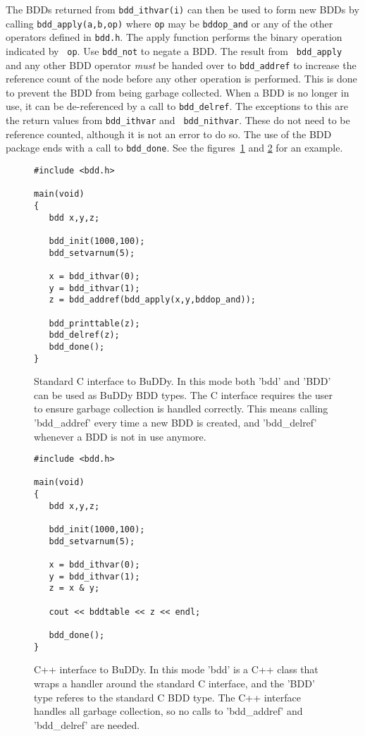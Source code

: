 \documentclass[a4paper,11pt,twoside,fleqn,openright]{report}
\newenvironment{Ill}
  {\\[\abovedisplayskip]\indent \begin{minipage}{\textwidth}}
  {\end{minipage} \\[\belowdisplayskip]}
\begin{document}
The BDDs returned from {\tt bdd\_ithvar(i)} can then be used to form
new BDDs by calling {\tt bdd\_apply(a,b,op)} where {\tt op} may be
{\tt bddop\_and} or any of the other operators defined in {\tt bdd.h}.
The apply function performs the binary operation indicated by {\tt
  op}.  Use {\tt bdd\_not} to negate a BDD.  The result from {\tt
  bdd\_apply} and any other BDD operator {\em must} be handed over to
{\tt bdd\_addref} to increase the reference count of the node before
any other operation is performed.  This is done to prevent the BDD
from being garbage collected. When a BDD is no longer in use, it can
be de-referenced by a call to {\tt bdd\_delref}.  The exceptions to
this are the return values from {\tt bdd\_ithvar} and {\tt
  bdd\_nithvar}. These do not need to be reference counted, although
it is not an error to do so. The use of the BDD package ends with a
call to {\tt bdd\_done}. See the figures~\ref{fig:cinterface} and
\ref{fig:cppinterface} for an example.

\begin{figure}[tb]
\begin{verbatim}
#include <bdd.h>

main(void)
{
   bdd x,y,z;

   bdd_init(1000,100);
   bdd_setvarnum(5);

   x = bdd_ithvar(0);
   y = bdd_ithvar(1);
   z = bdd_addref(bdd_apply(x,y,bddop_and));

   bdd_printtable(z);
   bdd_delref(z);
   bdd_done();
}
\end{verbatim}
  \caption{Standard C interface to BuDDy. In this mode both 'bdd' and
    'BDD' can be used as BuDDy BDD types. The C interface requires the
    user to ensure garbage collection is handled correctly. This means
    calling 'bdd\_addref' every time a new BDD is created, and
    'bdd\_delref' whenever a BDD is not in use anymore.}
  \label{fig:cinterface}
\end{figure}

\begin{figure}[tb]
\begin{verbatim}
#include <bdd.h>

main(void)
{
   bdd x,y,z;

   bdd_init(1000,100);
   bdd_setvarnum(5);

   x = bdd_ithvar(0);
   y = bdd_ithvar(1);
   z = x & y;

   cout << bddtable << z << endl;

   bdd_done();
}
\end{verbatim}
  \caption{C++ interface to BuDDy. In this mode 'bdd' is a C++ class
    that wraps a handler around the standard C interface, and the
    'BDD' type referes to the standard C BDD type. The C++ interface
    handles all garbage collection, so no calls to 'bdd\_addref' and
    'bdd\_delref' are needed.}
  \label{fig:cppinterface}
\end{figure}
\end{document}

